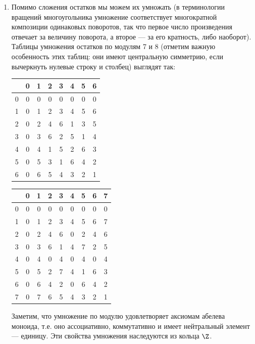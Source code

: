 \begin{enumerate}
\item Помимо сложения остатков мы можем их умножать (в терминологии вращений многоугольника умножение соответствует многократной композиции одинаковых поворотов, так что первое число произведения отвечает за величину поворота, а второе --- за его кратность, либо наоборот). Таблицы умножения остатков по модулям 7 и 8 (отметим важную особенность этих таблиц: они имеют центральную симметрию, если вычеркнуть нулевые строку и столбец) выглядят так:
\begin{center}
\begin{tabular}{c||c||c|c|c|c|c|c|}
  & 0 & 1 & 2 & 3 & 4 & 5 & 6 \\ \hline\hline
0 & 0 & 0 & 0 & 0 & 0 & 0 & 0 \\ \hline\hline
1 & 0 & 1 & 2 & 3 & 4 & 5 & 6 \\ \hline
2 & 0 & 2 & 4 & 6 & 1 & 3 & 5 \\ \hline
3 & 0 & 3 & 6 & 2 & 5 & 1 & 4 \\ \hline
4 & 0 & 4 & 1 & 5 & 2 & 6 & 3 \\ \hline
5 & 0 & 5 & 3 & 1 & 6 & 4 & 2 \\ \hline
6 & 0 & 6 & 5 & 4 & 3 & 2 & 1 \\ \hline
\end{tabular}
\qquad
\begin{tabular}{c||c||c|c|c|c|c|c|c|}
  & 0 & 1 & 2 & 3 & 4 & 5 & 6 & 7 \\ \hline\hline
0 & 0 & 0 & 0 & 0 & 0 & 0 & 0 & 0 \\ \hline\hline
1 & 0 & 1 & 2 & 3 & 4 & 5 & 6 & 7 \\ \hline
2 & 0 & 2 & 4 & 6 & 0 & 2 & 4 & 6 \\ \hline
3 & 0 & 3 & 6 & 1 & 4 & 7 & 2 & 5 \\ \hline
4 & 0 & 4 & 0 & 4 & 0 & 4 & 0 & 4 \\ \hline
5 & 0 & 5 & 2 & 7 & 4 & 1 & 6 & 3 \\ \hline
6 & 0 & 6 & 4 & 2 & 0 & 6 & 4 & 2 \\ \hline
7 & 0 & 7 & 6 & 5 & 4 & 3 & 2 & 1 \\ \hline
\end{tabular}
\end{center}

Заметим, что умножение по модулю удовлетворяет аксиомам абелева моноида, т.е. оно ассоциативно, коммутативно и имеет нейтральный элемент --- единицу. Эти свойства умножения наследуются из кольца $\Z$.


\end{enumerate}
